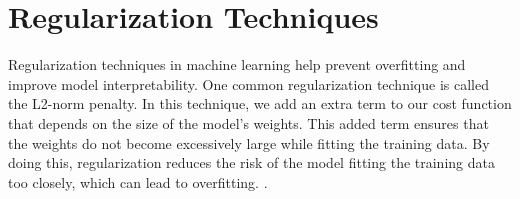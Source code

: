 \documentclass[a4paper, UKenglish, 11pt]{uiomaster}
\begin{document}
%
%
%
%
%
%
%



\section{Regularization Techniques}
Regularization techniques in machine learning help prevent overfitting and improve model interpretability. One common regularization technique is called the L2-norm penalty. In this technique, we add an extra term to our cost function that depends on the size of the model's weights. This added term ensures that the weights do not become excessively large while fitting the training data. By doing this, regularization reduces the risk of the model fitting the training data too closely, which can lead to overfitting. \cite{Hjorth-Jensen2022}.
\end{document}
